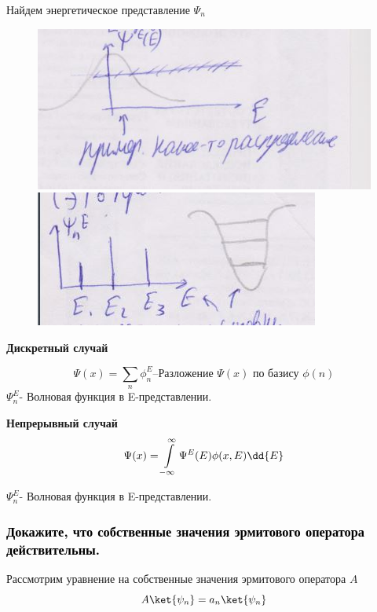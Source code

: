 Найдем энергетическое представление $\Psi_n$
\begin{figure}
\begin{minipage}{0.5\linewidth}
\includegraphics[width=\linewidth]{fig/fig152}
\caption{}
\vspace{-17pt}
\end{minipage}

\begin{minipage}{0.5\linewidth}
\includegraphics[width=\linewidth]{fig/fig151}
\caption{}
\vspace{-17pt}
\end{minipage}
\end{figure}

\textbf{Дискретный случай}

$$\Psi(x)=\sum\limits_n \phi_n^E \text{--Разложение $\Psi(x)$ по базису $\phi(n)$} $$
$\Psi_n^E$- Волновая функция в E-представлении.


\textbf{Непрерывный случай }
$$\Psi(x)=\infint \Psi^E(E)\phi(x,E)\dd{E} $$

$\Psi_n^E$- Волновая функция в E-представлении.

\subsubsection{\textcolor{black} {Докажите, что собственные значения эрмитового оператора действительны.} }
Рассмотрим уравнение на собственные значения эрмитового оператора $A$
$$
A\ket{\psi_n}=a_n\ket{\psi_n}
$$

